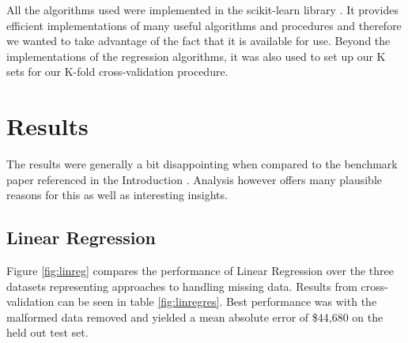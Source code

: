 \documentclass{acm_proc_article-sp}
\begin{document}
	All the algorithms used were implemented in the scikit-learn library \cite{scikit}. It provides efficient implementations of many useful algorithms and procedures and therefore we wanted to take advantage of the fact that it is available for use. Beyond the implementations of the regression algorithms, it was also used to set up our K sets for our K-fold cross-validation procedure. 

\section{Results} %
	 The results were generally a bit disappointing when compared to the benchmark paper referenced in the Introduction \cite{bostonres}. Analysis however offers many plausible reasons for this as well as interesting insights. 
	 
\subsection{Linear Regression}
	Figure \ref{fig:linreg} compares the performance of Linear Regression over the three datasets representing approaches to handling missing data. Results from cross-validation can be seen in table  \ref{fig:linregres}. Best performance was with the malformed data removed and yielded a mean absolute error of \$44,680 on the held out test set.
\end{document}
